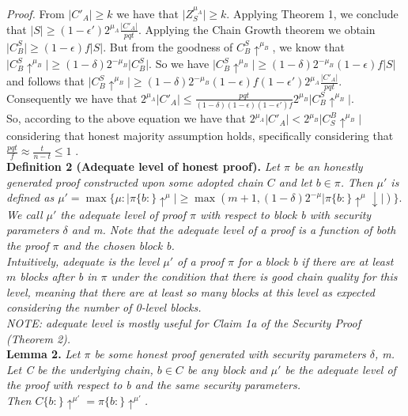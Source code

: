\documentclass[11pt,a4paper]{article}
\begin{document}
\textit{Proof.} From $\vert C'_A \vert \geq k$ we have that $\vert Z^{\mu_A}_S \vert \geq k$. Applying Theorem 1, we conclude that $\vert S \vert \geq (1-\epsilon')2^{\mu_A} \frac{\vert C'_A \vert}{pqt}$. Applying the Chain Growth theorem \cite{Backbone} we obtain $\vert C_{B}^S \vert \geq (1 - \epsilon)f \vert S \vert$. But from the goodness of $C_{B}^S \uparrow^{\mu_B}$, we know that $\vert C_{B}^S\uparrow^{\mu_B} \vert \geq (1 - \delta)2^{-\mu_B} \vert C_{B}^S \vert $. So we have $\vert C_{B}^S\uparrow^{\mu_B} \vert \geq (1 - \delta)2^{-\mu_B} (1 - \epsilon)f \vert S \vert $ and follows that $\vert C_{B}^S\uparrow^{\mu_B} \vert \geq (1 - \delta)2^{-\mu_B} (1 - \epsilon)f (1-\epsilon')2^{\mu_A} \frac{\vert C'_A \vert}{pqt} $. Consequently we have that $2^{\mu_A} \vert C'_A \vert \leq \frac{pqt}{(1- \delta)(1-\epsilon)(1-\epsilon')f} 2^{\mu_B} \vert C_{B}^S\uparrow^{\mu_B} \vert $.   \\

So, according to the above equation we have that $2^{\mu_A} \vert C'_A \vert <  2^{\mu_B} \vert    C^{B}_{S}\uparrow^{\mu_B}\vert $ considering that honest  majority assumption holds, specifically considering that $ \frac{pqt}{f} \approx \frac{t}{n-t} \leq 1 $ .\\

\textbf{Definition 2 (Adequate level of honest proof).} \textit{Let $\pi$ be an honestly generated proof constructed upon some adopted chain $C$ and let $b \in \pi $. Then $\mu'$ is defined as $\mu' = \max \{ \mu: \vert \pi\{b:\}\uparrow^{\mu} \vert \geq \max( m+1, (1-\delta)2^{-\mu} \vert \pi\{b:\}\uparrow^{\mu}\downarrow \vert )   \}$}.
\textit{We call $\mu'$ the adequate level of proof $\pi$ with respect to block b with security parameters $\delta$ and m. Note that the adequate level of a proof is a function of both the proof $\pi$ and the chosen block b.}\\

\textit{Intuitively, adequate is the level $\mu'$ of a proof $\pi$ for a block b if there are at least $m$ blocks after b in $\pi$ under the condition that there is good chain quality for this level, meaning that there are at least so many blocks at this level as expected considering the number of 0-level blocks.\\ 
NOTE: adequate level is mostly useful for Claim 1a of the Security Proof (Theorem 2).}\\

\textbf{Lemma 2.} \textit{Let $\pi$ be some honest proof generated with security parameters $\delta$, m. Let C be the underlying chain, $b \in C$ be any block and $\mu'$ be the adequate level of the proof with respect to b and the same security parameters.\\Then $C\{b:\}\uparrow^{\mu'} = \pi\{b:\}\uparrow^{\mu'}$.}\\
\end{document}

